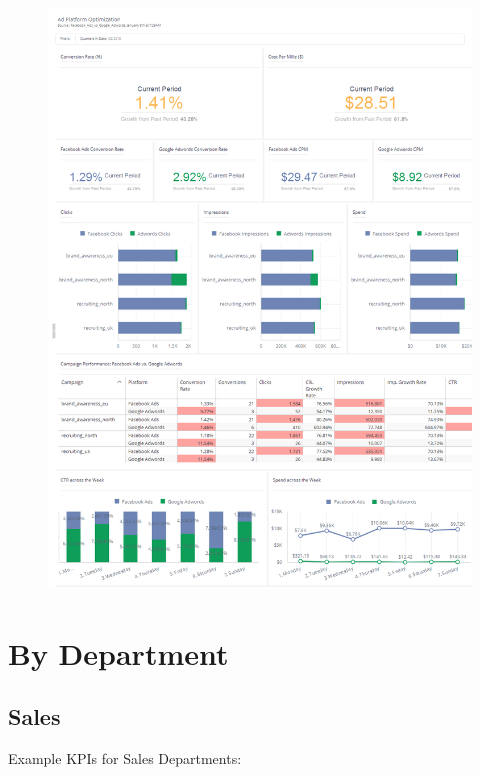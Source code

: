 \documentclass[]{book}
\begin{document}
\begin{figure}
\centering
\includegraphics{campaigns.png}
\caption{}
\end{figure}

\section{By Department}\label{by-department}

\subsection{Sales}\label{sales}

Example KPIs for Sales Departments:
\end{document}

